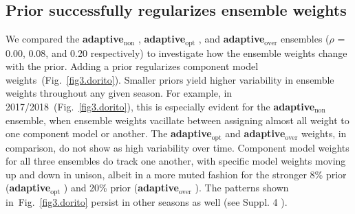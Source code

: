 \documentclass[sagev,times,Review,10pt]{sagej}
\def\adaptNon{\textbf{adaptive$_{\text{non}}$ }}
\def\adaptOpt{\textbf{adaptive$_{\text{opt}}$ }}
\def\adaptOver{\textbf{adaptive$_{\text{over}}$ }}
\begin{document}

\subsection{Prior successfully regularizes ensemble weights} 

We compared the \adaptNon, \adaptOpt, and \adaptOver ensembles ($\rho$ = 0.00, 0.08, and 0.20 respectively) to investigate how the ensemble weights change with the prior.
Adding a prior regularizes component model weights~(Fig.~\ref{fig3.dorito}).
Smaller priors yield higher variability in ensemble weights throughout any given season. 
For example, in 2017/2018~(Fig.~\ref{fig3.dorito}), this is especially evident for the \adaptNon ensemble, when ensemble weights vacillate between assigning almost all weight to one component model or another.
The \adaptOpt and \adaptOver weights, in comparison, do not show as high variability over time.
Component model weights for all three ensembles do track one another, with specific model weights moving up and down in unison, albeit in a more muted fashion for the stronger 8\% prior (\adaptOpt) and 20\% prior (\adaptOver).
The patterns shown in~Fig.~\ref{fig3.dorito} persist in other seasons as well (see Suppl. 4 %
).
\end{document}
